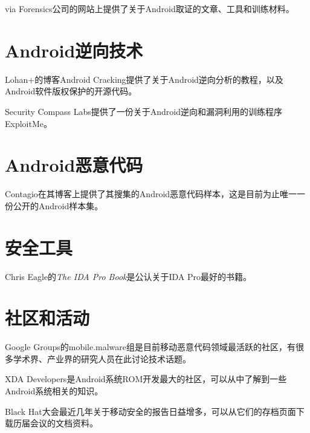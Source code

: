 via Forensics公司的网站\cite{url:viaforensics}上提供了关于Android取证的文章、工具和训练材料。

\section*{Android逆向技术}
Lohan+的博客Android Cracking\cite{url:androidcracking}提供了关于Android逆向分析的教程，以及Android软件版权保护的开源代码。

Security Compass Labs提供了一份关于Android逆向和漏洞利用的训练程序ExploitMe\cite{url:securitycompass}。

\section*{Android恶意代码}
Contagio在其博客\cite{url:contagio}上提供了其搜集的Android恶意代码样本，这是目前为止唯一一份公开的Android样本集。

\section*{安全工具}
Chris Eagle的{\it The IDA Pro Book}\cite{ida_pro}是公认关于IDA Pro最好的书籍。

\section*{社区和活动}
Google Groups的mobile.malware组\cite{url:group_mobilemalware}是目前移动恶意代码领域最活跃的社区，有很多学术界、产业界的研究人员在此讨论技术话题。

XDA Developers\cite{url:xda}是Android系统ROM开发最大的社区，可以从中了解到一些Android系统相关的知识。

Black Hat大会最近几年关于移动安全的报告日益增多，可以从它们的存档页面\cite{url:blackhat}下载历届会议的文档资料。


